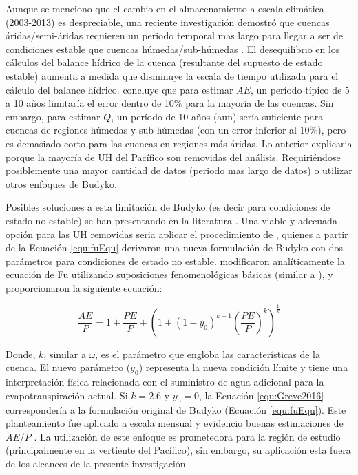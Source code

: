 \documentclass[12pt]{article}
\begin{document}


Aunque se menciono que el cambio en el almacenamiento a escala climática (2003-2013) es despreciable, una reciente investigación demostró que cuencas áridas/semi-áridas requieren un periodo temporal mas largo para llegar a ser de condiciones estable que cuencas húmedas/sub-húmedas \citep{hanassessing}. El desequilibrio en los cálculos del balance hídrico de la cuenca (resultante del supuesto de estado estable) aumenta a medida que disminuye la escala de tiempo utilizada para el cálculo del balance hídrico. \citet{hanassessing} concluye que para estimar $AE$, un período típico de 5 a 10 años limitaría el error dentro de 10\% para la mayoría de las cuencas. Sin embargo, para estimar $Q$, un período de 10 años (aun) sería suficiente para cuencas de regiones húmedas y sub-húmedas (con un error inferior al 10\%), pero es demasiado corto para las cuencas en regiones más áridas. Lo anterior explicaria porque la mayoría de UH del Pacífico son removidas del análisis. Requiriéndose posiblemente una mayor cantidad de datos (periodo mas largo de datos) o utilizar otros enfoques de Budyko.

Posibles soluciones a esta limitación de Budyko (es decir para condiciones de estado no estable) se han presentando en la literatura \citep{greve2016two,moussa2016budyko,fathi2019new,mianabadi2020budyko}. Una viable y adecuada opción para las UH removidas seria aplicar el procedimiento de \citet{greve2016two}, quienes a partir de la Ecuación \ref{equ:fuEqu} \citep{Fu1981,Zhang2004} derivaron una nueva formulación de Budyko con dos parámetros para condiciones de estado no estable. \citet{greve2016two} modificaron analíticamente la ecuación de Fu utilizando suposiciones fenomenológicas básicas (similar a \citet{Zhang2004}), y proporcionaron la siguiente ecuación:

\begin{equation}
    \frac{AE}{P} = 1 + \frac{PE}{P} + \left ( 1 + \left ( 1 - y_{0} \right )^{k-1} \left (\frac{PE}{P}  \right )^{k} \right )^{\frac{1}{k}}
    \label{equ:Greve2016}
\end{equation}

Donde, $k$, similar a $\omega$, es el parámetro que engloba las características de la cuenca. El nuevo parámetro ($y_{0}$) representa la nueva condición límite y tiene una interpretación física relacionada con el suministro de agua adicional para la evapotranspiración actual. Si $k=2.6$ y $y_{0}=0$, la Ecuación \ref{equ:Greve2016} correspondería a la formulación original de Budyko (Ecuación \ref{equ:fuEqu}). Este planteamiento fue aplicado a escala mensual y evidencio buenas estimaciones de $AE/P$ \citep{greve2016two}. La utilización de este enfoque es prometedora para la región de estudio (principalmente en la vertiente del Pacífico), sin embargo, su aplicación esta fuera de los alcances de la presente investigación. 
\end{document}
